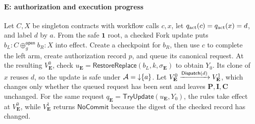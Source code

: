 \paragraph{\(\mathbf E\): authorization and execution progress}
Let \(C,X\) be singleton contracts with workflow calls \(c,x\), let \(q_{\rm act}(c)=q_{\rm act}(x)=d\), and label \(d\) by \(a\).
From the safe \(\mathbf 1\) root, a checked Fork update puts \(b_L{:}C\oplus_g^{\mathsf{open}}b_R{:}X\) into effect.
Create a checkpoint for \(b_R\), then use \(c\) to complete the left arm, create authorization record \(p\), and queue its canonical request.
At the resulting \(V_{\mathbf E}^0\), check \(u_{\mathbf E}=\mathsf{RestoreReplace}(b_L,k,\sigma_{\mathbf E})\) to obtain \(Y_0\).
Its clone of \(x\) reuses \(d\), so the update is safe under \(\mathcal A=\mathord{\downarrow}\{a\}\).
Let \(V_{\mathbf E}^0\xrightarrow{\mathsf{Dispatch}(d)}V_{\mathbf E}^1\), which changes only whether the queued request has been sent and leaves \(\mathbf P,\mathbf I,\mathbf C\) unchanged.
For the same request \(q_{\mathbf E}=\mathsf{TryUpdate}(u_{\mathbf E},Y_0)\), the rules take effect at \(V_{\mathbf E}^0\), while \(V_{\mathbf E}^1\) returns \(\mathsf{NoCommit}\) because the digest of the checked record has changed.

